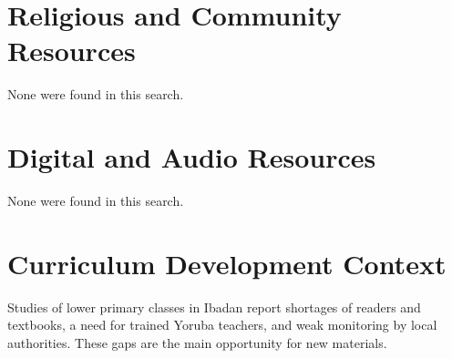 \documentclass[12pt]{article}
\begin{document}
\section{Religious and Community Resources}
None were found in this search.

\section{Digital and Audio Resources}
None were found in this search.

\section{Curriculum Development Context}
Studies of lower primary classes in Ibadan report shortages of readers and textbooks, a need for trained Yoruba teachers, and weak monitoring by local authorities. These gaps are the main opportunity for new materials.
\end{document}
